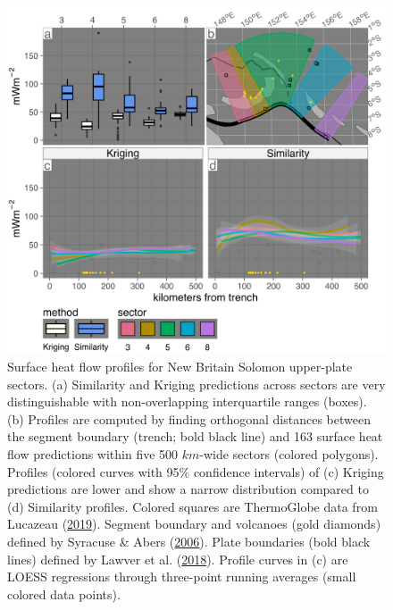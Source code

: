 \begin{figure}[htbp]

{\centering \includegraphics[width=1\linewidth,]{assets/figs/chpt3/NewBritainSolomonUpperPlate} 

}

\caption[Surface heat flow profiles for New Britain Solomon upper-plate sectors]{Surface heat flow profiles for New Britain Solomon upper-plate sectors. (a) Similarity and Kriging predictions across sectors are very distinguishable with non-overlapping interquartile ranges (boxes). (b) Profiles are computed by finding orthogonal distances between the segment boundary (trench; bold black line) and 163 surface heat flow predictions within five 500 \(km\)-wide sectors (colored polygons). Profiles (colored curves with 95\% confidence intervals) of (c) Kriging predictions are lower and show a narrow distribution compared to (d) Similarity profiles. Colored squares are ThermoGlobe data from Lucazeau (\protect\hyperlink{ref-lucazeau2019}{2019}). Segment boundary and volcanoes (gold diamonds) defined by Syracuse \& Abers (\protect\hyperlink{ref-syracuse2006}{2006}). Plate boundaries (bold black lines) defined by Lawver et al. (\protect\hyperlink{ref-lawver2018}{2018}). Profile curves in (c) are LOESS regressions through three-point running averages (small colored data points).}\label{fig:newBritainSolomonUpper}
\end{figure}

